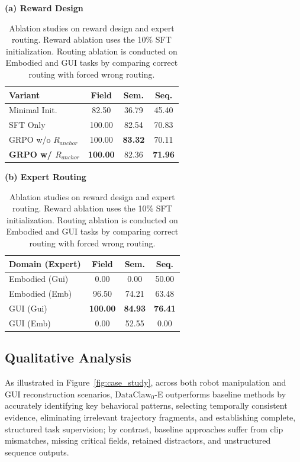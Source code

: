 \documentclass{llmxive}
\begin{document}
\begin{table}[t]
\centering
\small

\begin{minipage}{0.48\textwidth}
\centering
\textbf{(a) Reward Design}\\[2mm]
\begin{tabular}{lccc}
\toprule
\textbf{Variant} & \textbf{Field} & \textbf{Sem.} & \textbf{Seq.} \\
\midrule
Minimal Init. & 82.50 & 36.79 & 45.40 \\
SFT Only & 100.00 & 82.54 & 70.83 \\
GRPO w/o \(R_{anchor}\) & 100.00 & \textbf{83.32} & 70.11 \\
\textbf{GRPO w/ \(R_{anchor}\)} & \textbf{100.00} & 82.36 & \textbf{71.96} \\
\bottomrule
\end{tabular}
\end{minipage}
\hfill
\begin{minipage}{0.48\textwidth}
\centering
\textbf{(b) Expert Routing}\\[2mm]
\begin{tabular}{lccc}
\toprule
\textbf{Domain (Expert)} & \textbf{Field} & \textbf{Sem.} & \textbf{Seq.} \\
\midrule
Embodied (Gui) & 0.00 & 0.00 & 50.00 \\
Embodied (Emb) & 96.50 & 74.21 & 63.48 \\
GUI (Gui) & \textbf{100.00} & \textbf{84.93} & \textbf{76.41} \\
GUI (Emb) & 0.00 & 52.55 & 0.00 \\
\bottomrule
\end{tabular}
\end{minipage}

\caption{Ablation studies on reward design and expert routing. Reward ablation uses the 10\% SFT initialization. Routing ablation is conducted on Embodied and GUI tasks by comparing correct routing with forced wrong routing.}
\label{tab:ablation}
\end{table}



\subsection{Qualitative Analysis}
As illustrated in Figure~\ref{fig:case_study}, across both robot manipulation and GUI reconstruction scenarios, $\text{DataClaw}_0$-E outperforms baseline methods by accurately identifying key behavioral patterns, selecting temporally consistent evidence, eliminating irrelevant trajectory fragments, and establishing complete, structured task supervision; by contrast, baseline approaches suffer from clip mismatches, missing critical fields, retained distractors, and unstructured sequence outputs.      
\end{document}
